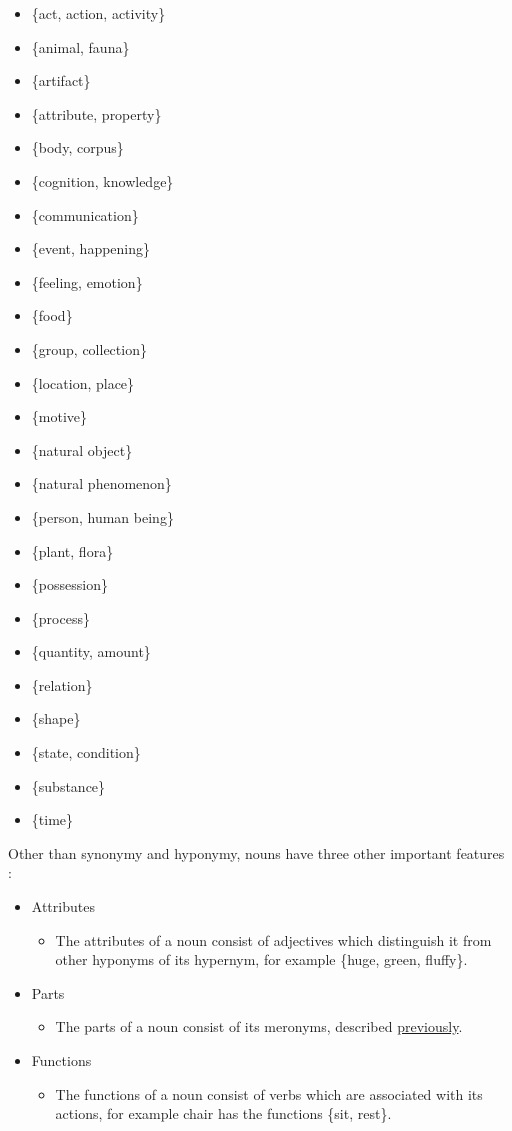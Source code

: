\documentclass[]{article}
\begin{document}
\begin{multicols}{2}
\begin{itemize}
	\item[] \{act, action, activity\}
	\item[] \{animal, fauna\}
	\item[] \{artifact\}
	\item[] \{attribute, property\}
	\item[] \{body, corpus\}
	\item[] \{cognition, knowledge\}
	\item[] \{communication\}
	\item[] \{event, happening\}
	\item[] \{feeling, emotion\}
	\item[] \{food\}
	\item[] \{group, collection\}
	\item[] \{location, place\}
	\item[] \{motive\}
	\item[] \{natural object\}
	\item[] \{natural phenomenon\}
	\item[] \{person, human being\}
	\item[] \{plant, flora\}
	\item[] \{possession\}
	\item[] \{process\}
	\item[] \{quantity, amount\}
	\item[] \{relation\}
	\item[] \{shape\}
	\item[] \{state, condition\}
	\item[] \{substance\}
	\item[] \{time\}
\end{itemize}
\end{multicols}

Other than synonymy and hyponymy, nouns have three other important features \cite{WN2Nouns}:
\begin{itemize}
	\item Attributes
	\begin{itemize}
		\item The attributes of a noun consist of adjectives which distinguish it from other hyponyms of its hypernym, for example \{huge, green, fluffy\}.
	\end{itemize}		
	
	\item Parts
	\begin{itemize}
		\item The parts of a noun consist of its meronyms, described \hyperref[Meronym]{previously}.
	\end{itemize}		
	
	\item Functions
	\begin{itemize}
		\item The functions of a noun consist of verbs which are associated with its actions, for example chair has the functions \{sit, rest\}.
	\end{itemize}		
	
\end{itemize}
\end{document}
